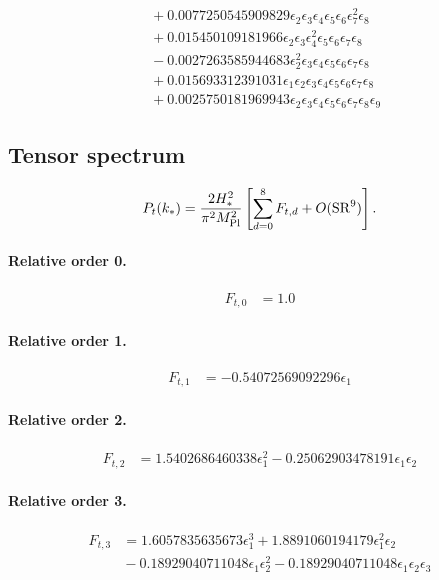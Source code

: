 \documentclass[10pt]{article}
\begin{document}
\begin{align*}
&{}  + 0.0077250545909829 \epsilon_{2} \epsilon_{3} \epsilon_{4} \epsilon_{5} \epsilon_{6} \epsilon_{7}^{2} \epsilon_{8} \\
&{}  + 0.015450109181966 \epsilon_{2} \epsilon_{3} \epsilon_{4}^{2} \epsilon_{5} \epsilon_{6} \epsilon_{7} \epsilon_{8} \\
&{}  - 0.0027263585944683 \epsilon_{2}^{2} \epsilon_{3} \epsilon_{4} \epsilon_{5} \epsilon_{6} \epsilon_{7} \epsilon_{8} \\
&{}  + 0.015693312391031 \epsilon_{1} \epsilon_{2} \epsilon_{3} \epsilon_{4} \epsilon_{5} \epsilon_{6} \epsilon_{7} \epsilon_{8} \\
&{}  + 0.0025750181969943 \epsilon_{2} \epsilon_{3} \epsilon_{4} \epsilon_{5} \epsilon_{6} \epsilon_{7} \epsilon_{8} \epsilon_{9}
\end{align*}

\subsection{Tensor spectrum}
\[P_t(k_*)=\frac{2H_*^2}{\pi^2M_{\rm Pl}^2}\left[\sum_{d=0}^{8}F_{t,d}+O(\mathrm{SR}^{9})\right].\]
\paragraph{Relative order 0.}
\begin{align*}
F_{t,0} &= 1.0
\end{align*}

\paragraph{Relative order 1.}
\begin{align*}
F_{t,1} &=  - 0.54072569092296 \epsilon_{1}
\end{align*}

\paragraph{Relative order 2.}
\begin{align*}
F_{t,2} &= 1.5402686460338 \epsilon_{1}^{2} - 0.25062903478191 \epsilon_{1} \epsilon_{2}
\end{align*}

\paragraph{Relative order 3.}
\begin{align*}
F_{t,3} &= 1.6057835635673 \epsilon_{1}^{3} + 1.8891060194179 \epsilon_{1}^{2} \epsilon_{2} \\
&{}  - 0.18929040711048 \epsilon_{1} \epsilon_{2}^{2} - 0.18929040711048 \epsilon_{1} \epsilon_{2} \epsilon_{3}
\end{align*}
\end{document}
